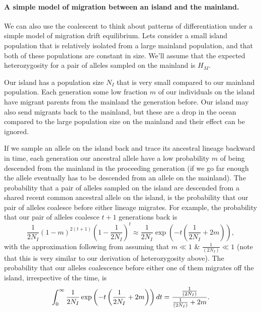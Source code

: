 \paragraph{A simple model of migration between an island and the mainland.}
We can also use the coalescent to think about patterns of
differentiation under a simple model of migration drift
equilibrium. Lets consider a small island population that is relatively isolated
from a large mainland population, and that both of these populations
are constant in size. We'll assume that the expected heterozygosity
for a pair of alleles sampled on the mainland is $H_M$.

Our island has a population size
$N_{I}$ that is very small compared to our mainland population.
Each generation some low fraction $m$ of our individuals on the
island have migrant parents from the mainland the generation
before. Our island may also send migrants back to the mainland, but
these are a drop in the ocean compared to the large population size on
the mainland and their effect can be ignored. 


If we sample an allele on the island back and trace its ancestral
lineage backward in time, each generation our ancestral allele have a low
probability $m$ of being descended from the mainland in the proceeding
generation (if we go far enough the allele eventually has to be
descended from an allele on the mainland). The probability that a pair of alleles sampled on the
island are descended from a shared recent common ancestral allele on the island, is the
probability that our pair of alleles coalesce before either lineage
migrates. For example, the probability that our pair of alleles
coalesce $t+1$ generations back is 
\begin{equation}
\frac{1}{2N_I}(1-m)^{2(t+1)} \left(1-\frac{1}{2N_I} \right)^{t} \approx
\frac{1}{2N_I} \exp\left( -t\left (\frac{1}{2N_I} + 2m\right) \right),
\end{equation}
with the approximation following from assuming that $m \ll 1$ \& $\frac{1}{(2N_I)}
\ll 1$ (note that this is very similar to our derivation of
heterozygosity above). The probability that our alleles coalescence before either one
of them migrates off the island, irrespective of the time, is
\begin{equation}
\int_0^{\infty} \frac{1}{2N_I} \exp\left( -t\left (\frac{1}{2N_I} +
2m\right) \right) dt = \frac{\nicefrac{1}{(2N_I)}}{\nicefrac{1}{(2N_I)} +
    2m}.
\end{equation}

